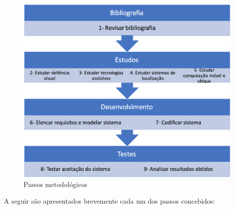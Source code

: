 \documentclass[english,brazilian]{UNISINOSmonografia}
\begin{document}
\begin{figure}[!ht]
	\caption{Passos metodológicos}
	\label{fig:passosMetodologicos}
	\centering%
	\begin{minipage}{.7\textwidth}
		\includegraphics[width=\textwidth]{imgs/passosMetodologicos}
	\end{minipage}
\end{figure}

A seguir são apresentados brevemente cada um dos passos concebidos:
\end{document}
